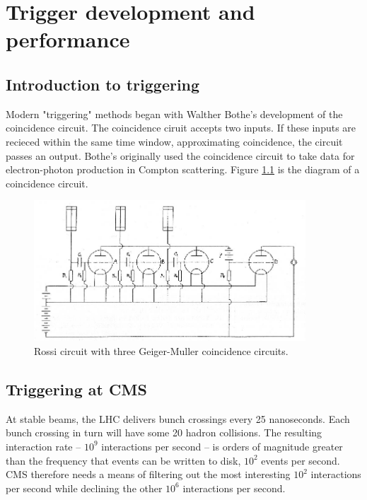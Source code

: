 
\chapter{Trigger development and performance}

\section{Introduction to triggering}

Modern "triggering" methods began with Walther Bothe's development of the coincidence circuit. The coincidence ciruit accepts two inputs. If these inputs are recieced within the same time window, approximating coincidence, the circuit passes an output. Bothe's originally used the coincidence circuit to take data for electron-photon production in Compton scattering. Figure \ref{fig:ross} is the diagram of a coincidence circuit. 

\begin{figure}[h!]
\begin{centering}
\includegraphics[width=4in]{Chapter5/importfigs/Rossis-coincidence-circuit-appearing-in-Ref-65-The-selecting-resistance-on-the-right.png}
\par\end{centering}
\caption{Rossi circuit with three Geiger-Muller coincidence circuits. \label{fig:ross}}
\end{figure}

\section{Triggering at CMS}

At stable beams, the LHC delivers bunch crossings every 25 nanoseconds. Each bunch crossing in turn will have some 20 hadron collisions. The resulting interaction rate -- $10^9$ interactions per second -- is orders of magnitude greater than the frequency that events can be written to disk, $10^2$ events per second. CMS therefore needs a means of filtering out the most interesting $10^2$ interactions per second while declining the other $10^6$ interactions per second. 


